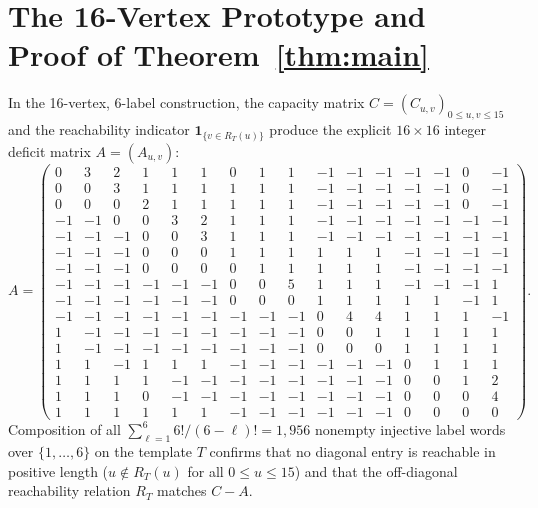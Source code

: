 \documentclass[10pt,reqno]{amsart}
\theoremstyle{definition}
\begin{document}
\section{The 16-Vertex Prototype and Proof of Theorem~\ref{thm:main}}

In the 16-vertex, 6-label construction, the capacity matrix $C=(C_{u,v})_{0\le u,v\le 15}$ and the reachability indicator $\mathbf{1}_{\{v\in R_T(u)\}}$ produce the explicit $16\times 16$ integer deficit matrix $A=(A_{u,v})$:
\[
A = \left(\begin{smallmatrix}
 0 &  3 &  2 &  1 &  1 &  1 &  0 &  1 &  1 & -1 & -1 & -1 & -1 & -1 &  0 & -1 \\
 0 &  0 &  3 &  1 &  1 &  1 &  1 &  1 &  1 & -1 & -1 & -1 & -1 & -1 &  0 & -1 \\
 0 &  0 &  0 &  2 &  1 &  1 &  1 &  1 &  1 & -1 & -1 & -1 & -1 & -1 &  0 & -1 \\
-1 & -1 &  0 &  0 &  3 &  2 &  1 &  1 &  1 & -1 & -1 & -1 & -1 & -1 & -1 & -1 \\
-1 & -1 & -1 &  0 &  0 &  3 &  1 &  1 &  1 & -1 & -1 & -1 & -1 & -1 & -1 & -1 \\
-1 & -1 & -1 &  0 &  0 &  0 &  1 &  1 &  1 &  1 &  1 &  1 & -1 & -1 & -1 & -1 \\
-1 & -1 & -1 &  0 &  0 &  0 &  0 &  1 &  1 &  1 &  1 &  1 & -1 & -1 & -1 & -1 \\
-1 & -1 & -1 & -1 & -1 & -1 &  0 &  0 &  5 &  1 &  1 &  1 & -1 & -1 & -1 &  1 \\
-1 & -1 & -1 & -1 & -1 & -1 &  0 &  0 &  0 &  1 &  1 &  1 &  1 &  1 & -1 &  1 \\
-1 & -1 & -1 & -1 & -1 & -1 & -1 & -1 & -1 &  0 &  4 &  4 &  1 &  1 &  1 & -1 \\
 1 & -1 & -1 & -1 & -1 & -1 & -1 & -1 & -1 &  0 &  0 &  1 &  1 &  1 &  1 &  1 \\
 1 & -1 & -1 & -1 & -1 & -1 & -1 & -1 & -1 &  0 &  0 &  0 &  1 &  1 &  1 &  1 \\
 1 &  1 & -1 &  1 &  1 &  1 & -1 & -1 & -1 & -1 & -1 & -1 &  0 &  1 &  1 &  1 \\
 1 &  1 &  1 &  1 & -1 & -1 & -1 & -1 & -1 & -1 & -1 & -1 &  0 &  0 &  1 &  2 \\
 1 &  1 &  1 &  0 & -1 & -1 & -1 & -1 & -1 & -1 & -1 & -1 &  0 &  0 &  0 &  4 \\
 1 &  1 &  1 &  1 &  1 &  1 & -1 & -1 & -1 & -1 & -1 & -1 &  0 &  0 &  0 &  0
\end{smallmatrix}\right).
\]
Composition of all $\sum_{\ell=1}^6 6!/ (6-\ell)! = 1{,}956$ nonempty injective label words over $\{1,\dots,6\}$ on the template $T$ confirms that no diagonal entry is reachable in positive length ($u\notin R_T(u)$ for all $0\le u\le 15$) and that the off-diagonal reachability relation $R_T$ matches $C-A$.
\end{document}
